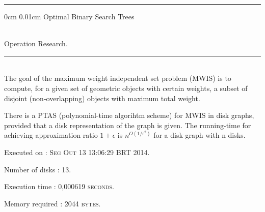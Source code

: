 \documentclass{article}
\makeatletter
\newcommand{\HRule}{\noindent\rule{\linewidth}{0.5mm}}
\renewcommand\section{\@startsection
  {section}{1}{0mm}%
  {0cm}%
  {0.01cm}%
  {\Huge\bfseries\color{black}}}%
\makeatother
\begin{document}
\HRule

\section{Optimal Binary Search Trees}

 \\[0.4cm]
{\LARGE Operation Research.}\\[0.4cm]
\HRule \\[0.5cm]
\indent The goal of the maximum weight independent set problem (MWIS) is to compute, for a given set of geometric objects with certain weights, a subset of disjoint (non-overlapping) objects with maximum total weight.

There is a PTAS (polynomial-time algorihtm scheme) for MWIS in disk graphs, provided that a disk representation of the graph is given. 
The running-time for achieving approximation ratio $1+\epsilon$ 
is $n^{O(1/\epsilon^{2})}$ for a disk graph with n disks.\\[0.5cm]
\begin{compactitem}
\item Executed on : \textsc{Seg Out 13 13:06:29 BRT 2014}. 
\item Number of disks : \textsc{13}. 
\item Execution time : \textsc{0,000619 seconds}. 
\item Memory required : \textsc{2044 bytes}. 
\end{compactitem}
\end{document}
